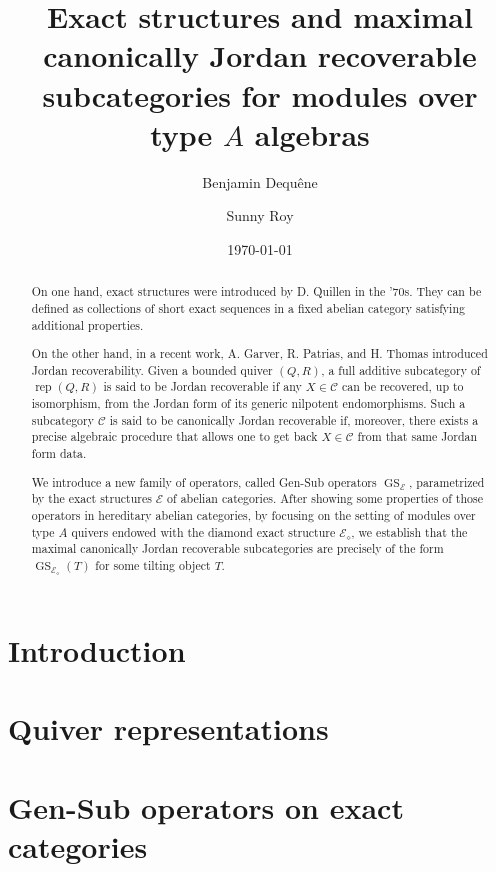 \documentclass{amsart}
\author[B.~Dequêne]{Benjamin Dequêne}
\author[S.~Roy]{Sunny Roy}
\date{\today}
\title[Exact struc. and CJR categories in type $A$]{Exact structures and maximal canonically Jordan recoverable subcategories for modules over type $A$ algebras}
\theoremstyle{plain}
\newcommand{\rep}{\operatorname{rep}}
\newcommand{\GS}{\operatorname{GS}}
\begin{document}
\begin{abstract}
On one hand, exact structures were introduced by D. Quillen in the '70s. They can be defined as collections of short exact sequences in a fixed abelian category satisfying additional properties. 

On the other hand, in a recent work, A. Garver, R. Patrias, and H. Thomas introduced Jordan recoverability. Given a bounded quiver $(Q,R)$, a full additive subcategory of $\rep(Q,R)$ is said to be Jordan recoverable if any $X \in \mathscr{C}$ can be recovered, up to isomorphism, from the Jordan form of its generic nilpotent endomorphisms. Such a subcategory $\mathscr{C}$ is said to be canonically Jordan recoverable if, moreover, there exists a precise algebraic procedure that allows one to get back $X \in \mathscr{C}$ from that same Jordan form data.

We introduce a new family of operators, called Gen-Sub operators $\GS_\mathcal{E}$, parametrized by the exact structures $\mathcal{E}$ of abelian categories. After showing some properties of those operators in hereditary abelian categories, by focusing on the setting of modules over type $A$ quivers endowed with the diamond exact structure $\mathcal{E}_\diamond$, we establish that the maximal canonically Jordan recoverable subcategories are precisely of the form $\operatorname{GS}_{\mathcal{E}_\diamond}(T)$ for some tilting object $T$.
\end{abstract}

\maketitle

\tableofcontents


\section{Introduction}
\label{sec:Intro}


\section{Quiver representations}
\label{sec:Quiver}


\section{Gen-Sub operators on exact categories}
\label{sec:ExStr}
%

\end{document}

